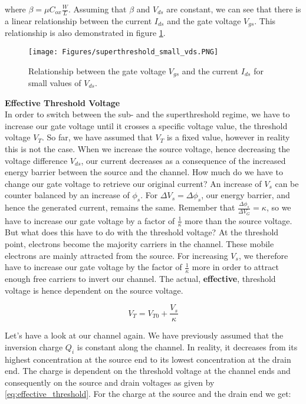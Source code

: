 where $\beta = \mu C_{ox} \frac{W}{L}$. Assuming that $\beta$ and $V_{ds}$ are constant, we can see that there is a linear relationship between the current $I_{ds}$ and the gate voltage $V_{gs}$. This relationship is also demonstrated in figure \ref{fig:super_small_vds}.\\

\begin{figure}
    \centering
    \texttt{[image: Figures/superthreshold\_small\_vds.PNG]}
    \caption{Relationship between the gate voltage $V_{gs}$ and the current $I_{ds}$ for small values of $V_{ds}$.}
    \label{fig:super_small_vds}
\end{figure}

\textbf{Effective Threshold Voltage}\\

In order to switch between the sub- and the superthreshold regime, we have to increase our gate voltage until it crosses a specific voltage value, the threshold voltage $V_T$. So far, we have assumed that $V_T$ is a fixed value, however in reality this is not the case. When we increase the source voltage, hence decreasing the voltage difference $V_{ds}$, our current decreases as a consequence of the increased energy barrier between the source and the channel. How much do we have to change our gate voltage to retrieve our original current? An increase of $V_s$ can be counter balanced by an increase of $\phi_s$. For $\Delta V_s = \Delta \phi_s$, our energy barrier, and hence the generated current, remains the same. Remember that $\frac{\Delta \phi_s}{\Delta V_G} = \kappa$, so we have to increase our gate voltage by a factor of $\frac{1}{\kappa}$ more than the source voltage. But what does this have to do with the threshold voltage? At the threshold point, electrons become the majority carriers in the channel. These mobile electrons are mainly attracted from the source. For increasing $V_s$, we therefore have to increase our gate voltage by the factor of $\frac{1}{\kappa}$ more in order to attract enough free carriers to invert our channel. The actual, \textbf{effective}, threshold voltage is hence dependent on the source voltage.

\begin{equation}
    V_T = V_{T0} + \frac{V_s}{\kappa}\label{eq:effective_threshold}
\end{equation}

Let's have a look at our channel again. We have previously assumed that the inversion charge $Q_i$ is constant along the channel. In reality, it decreases from its highest concentration at the source end to its lowest concentration at the drain end. The charge is dependent on the threshold voltage at the channel ends and consequently on the source and drain voltages as given by \eqref{eq:effective_threshold}. For the charge at the source and the drain end we get:

